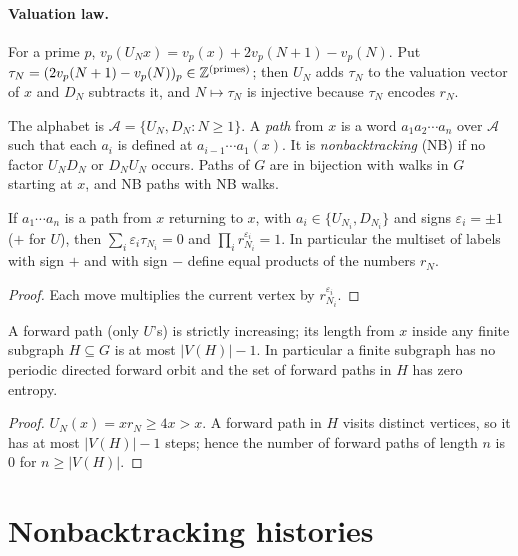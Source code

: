 \paragraph{Valuation law.}
For a prime $p$, $v_p(U_N x)=v_p(x)+2v_p(N+1)-v_p(N)$. Put $\tau_N=(2v_p(N+1)-v_p(N))_p\in\mathbb{Z}^{(\mathrm{primes})}$; then $U_N$ adds $\tau_N$ to the valuation vector of $x$ and $D_N$ subtracts it, and $N\mapsto\tau_N$ is injective because $\tau_N$ encodes $r_N$.

\begin{definition}
The alphabet is $\mathcal A=\{U_N,D_N:N\ge1\}$. A \emph{path} from $x$ is a word $a_1a_2\cdots a_n$ over $\mathcal A$ such that each $a_i$ is defined at $a_{i-1}\cdots a_1(x)$. It is \emph{nonbacktracking} (NB) if no factor $U_ND_N$ or $D_NU_N$ occurs. Paths of $G$ are in bijection with walks in $G$ starting at $x$, and NB paths with NB walks.
\end{definition}

\begin{lemma}[Closure]\label{lem:closure}
If $a_1\cdots a_n$ is a path from $x$ returning to $x$, with $a_i\in\{U_{N_i},D_{N_i}\}$ and signs $\varepsilon_i=\pm1$ ($+$ for $U$), then $\sum_i\varepsilon_i\tau_{N_i}=0$ and $\prod_i r_{N_i}^{\varepsilon_i}=1$. In particular the multiset of labels with sign $+$ and with sign $-$ define equal products of the numbers $r_N$.
\end{lemma}
\begin{proof}
Each move multiplies the current vertex by $r_{N_i}^{\varepsilon_i}$. \qedhere
\end{proof}

\begin{proposition}\label{prop:forward}
A forward path (only $U$'s) is strictly increasing; its length from $x$ inside any finite subgraph $H\subseteq G$ is at most $|V(H)|-1$. In particular a finite subgraph has no periodic directed forward orbit and the set of forward paths in $H$ has zero entropy.
\end{proposition}
\begin{proof}
$U_N(x)=xr_N\ge 4x>x$. A forward path in $H$ visits distinct vertices, so it has at most $|V(H)|-1$ steps; hence the number of forward paths of length $n$ is $0$ for $n\ge|V(H)|$. \qedhere
\end{proof}

\section{Nonbacktracking histories}\label{sec:nb}

